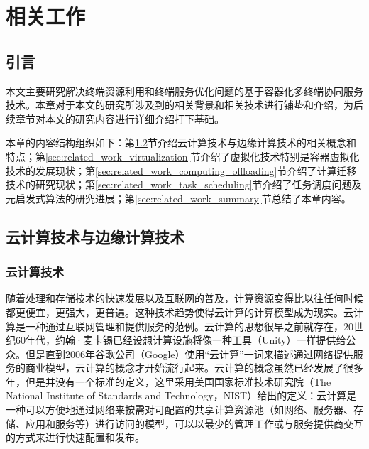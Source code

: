 \chapter{相关工作 }\label{chap:related_work}

\section{引言}

本文主要研究解决终端资源利用和终端服务优化问题的基于容器化多终端协同服务技术。本章对于本文的研究所涉及到的相关背景和相关技术进行铺垫和介绍，为后续章节对本文的研究内容进行详细介绍打下基础。

本章的内容结构组织如下：第\ref{sec:related_work_cloud_computing}节介绍云计算技术与边缘计算技术的相关概念和特点；第\ref{sec:related_work_virtualization}节介绍了虚拟化技术特别是容器虚拟化技术的发展现状；第\ref{sec:related_work_computing_offloading}节介绍了计算迁移技术的研究现状；第\ref{sec:related_work_task_scheduling}节介绍了任务调度问题及元启发式算法的研究进展；第\ref{sec:related_work_summary}节总结了本章内容。

\section{云计算技术与边缘计算技术}\label{sec:related_work_cloud_computing}

\subsection{云计算技术}

随着处理和存储技术的快速发展以及互联网的普及，计算资源变得比以往任何时候都更便宜，更强大，更普遍。这种技术趋势使得云计算的计算模型成为现实。云计算是一种通过互联网管理和提供服务的范例\cite{zhang2010cloud,josep2010view}。云计算的思想很早之前就存在，20世纪60年代，约翰·麦卡锡已经设想计算设施将像一种工具（Unity）一样提供给公众\cite{parkhill1966challenge}。但是直到2006年谷歌公司（Google）使用“云计算”一词来描述通过网络提供服务的商业模型，云计算的概念才开始流行起来。云计算的概念虽然已经发展了很多年，但是并没有一个标准的定义\cite{sonnek2009virtual}，这里采用美国国家标准技术研究院（The National Institute of Standards and Technology，NIST）给出的定义\cite{zhang2010cloud}：云计算是一种可以方便地通过网络来按需对可配置的共享计算资源池（如网络、服务器、存储、应用和服务等）进行访问的模型，可以以最少的管理工作或与服务提供商交互的方式来进行快速配置和发布。

